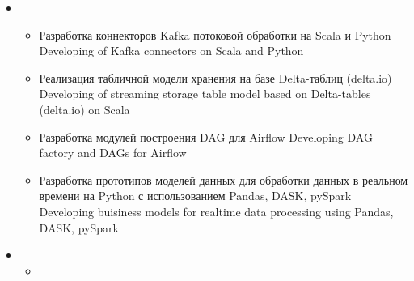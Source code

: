 \documentclass[11pt,a4paper,sans]{moderncv}        %
\begin{document}
{\begin{itemize}
\begin{itemize}
			\item {}
				{Разработка архитектуры интеграции Hadoop и Kubernetes}
				{Hadoop and Kubernetes integration}
			\item {}
				{Разработка архитектуры DataGovernance и DataLineage: LinkedIn DataHub, Atlas}
				{Desing and implementation of a data governance and data lineage subsystem: LinkedIn DataHub, Apache Atlas}
			\item {}
				{Разработка архитектуры подсистемы качества данных: GreatExpectaion, Apache Griffin}
				{Design and implementation of a data quality and data assurance subsystem: Great Expectations, Apache Griffin}
			\item {}
				{Разработка архитектуры виртуализации данных и интеграции озера данных с существующим хранилищем данных, миграция с Hive на Trino}
				{Desing and implementation of data virtualization subsystem: Trino; DWH intergation: PolyBase}
			\item {}
				{Разработка и внедрение архитектуры оркестрации данных с использованием Alluxio}
				{Desing of data orchestration subsystem: Alluxio }
		\end{itemize}
		\item {}
		\begin{itemize}
			\item {}
				{Разработка коннекторов Kafka потоковой обработки на Scala и Python}
				{Developing of Kafka connectors on Scala and Python}
			\item {}
				{Реализация табличной модели хранения на базе Delta-таблиц (delta.io)}
				{Developing of streaming storage table model based on Delta-tables (delta.io) on Scala}
			\item {}
				{Разработка модулей построения DAG для Airflow}
				{Developing DAG factory and DAGs for Airflow}
			\item {}
				{Разработка прототипов моделей данных для обработки данных в реальном времени на Python с использованием Pandas, DASK, pySpark}
				{Developing buisiness models for realtime data processing using Pandas, DASK, pySpark}
		\end{itemize}
		\item {}
		\begin{itemize}
			\item {}

\end{itemize}
\end{itemize}}
\end{document}
